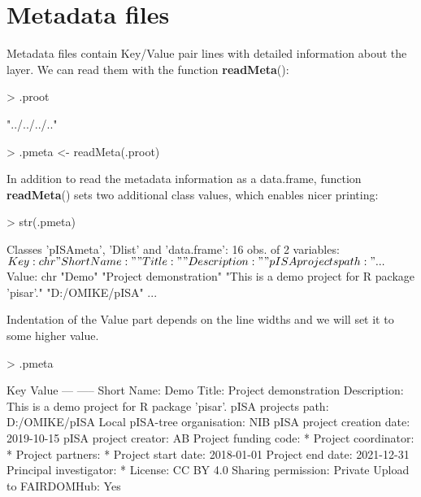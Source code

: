 \documentclass[a4paper,12pt]{article}\usepackage[]{graphicx}\usepackage[]{color}
\makeatletter
\providecommand\code{\bgroup\@codex}
\def\@codex#1{{\normalfont\ttfamily\hyphenchar\font=-1  #1}\egroup}
\providecommand{\fct}[1]{{\ttfamily\textbf{#1}()}}
\makeatother
\begin{document}
\section{Metadata files}

Metadata files contain Key/Value pair lines with detailed information about the layer. We can read them with the function \fct{readMeta}:

\begin{Schunk}
\begin{Sinput}
> .proot
\end{Sinput}
\begin{Soutput}
[1] "../../../.."
\end{Soutput}
\begin{Sinput}
> .pmeta <- readMeta(.proot)
\end{Sinput}
\end{Schunk}

In addition to read the metadata information as a \code{data.frame}, function
\fct{readMeta} sets two additional class values, which enables nicer printing:

\begin{Schunk}
\begin{Sinput}
> str(.pmeta)
\end{Sinput}
\begin{Soutput}
Classes 'pISAmeta', 'Dlist' and 'data.frame':	16 obs. of  2 variables:
 $ Key  : chr  "Short Name:" "Title:" "Description:" "pISA projects path:" ...
 $ Value: chr  "Demo" "Project demonstration" "This is a demo project for R package 'pisar'." "D:/OMIKE/pISA" ...
\end{Soutput}
\end{Schunk}

Indentation of the Value part depends on the line widths and we will set it to some higher value.

\begin{Schunk}
\begin{Sinput}
> .pmeta
\end{Sinput}
\begin{Soutput}
 Key                           Value
 ---                           -----
 Short Name:                   Demo
 Title:                        Project demonstration
 Description:                  This is a demo project for R package 'pisar'.
 pISA projects path:           D:/OMIKE/pISA
 Local pISA-tree organisation: NIB
 pISA project creation date:   2019-10-15
 pISA project creator:         AB
 Project funding code:         *
 Project coordinator:          *
 Project partners:             *
 Project start date:           2018-01-01
 Project end date:             2021-12-31
 Principal investigator:       *
 License:                      CC BY 4.0
 Sharing permission:           Private
 Upload to FAIRDOMHub:         Yes
\end{Soutput}
\end{Schunk}
\end{document}
